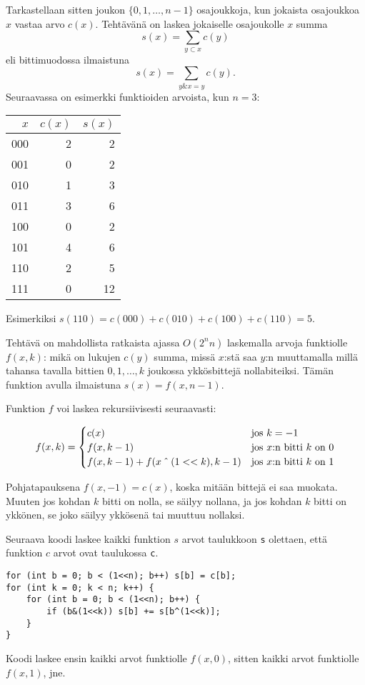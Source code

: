 Tarkastellaan sitten
joukon $\{0,1,\ldots,n-1\}$ osajoukkoja,
kun jokaista osajoukkoa $x$ vastaa arvo $c(x)$.
Tehtävänä on laskea jokaiselle osajoukolle $x$
summa
\[s(x)=\sum_{y \subset x} c(y) \]
eli bittimuodossa ilmaistuna
\[s(x)=\sum_{y \& x = y} c(y). \]
Seuraavassa on esimerkki funktioiden arvoista,
kun $n=3$:
\begin{center}
\begin{tabular}{rrr}
$x$ & $c(x)$ & $s(x)$ \\
\hline
000 & 2 & 2 \\
001 & 0 & 2 \\
010 & 1 & 3 \\
011 & 3 & 6 \\
100 & 0 & 2 \\
101 & 4 & 6 \\
110 & 2 & 5 \\
111 & 0 & 12 \\
\end{tabular}
\end{center}
Esimerkiksi $s(110)=c(000)+c(010)+c(100)+c(110)=5$. 

Tehtävä on mahdollista ratkaista ajassa $O(2^n n)$
laskemalla arvoja funktiolle $f(x,k)$:
mikä on lukujen $c(y)$ summa, missä $x$:stä saa $y$:n
muuttamalla millä tahansa tavalla bittien $0,1,\ldots,k$
joukossa ykkösbittejä nollabiteiksi.
Tämän funktion avulla ilmaistuna $s(x)=f(x,n-1)$.

Funktion $f$ voi laskea rekursiivisesti seuraavasti:

\begin{equation*}
    f(x,k) = \begin{cases}
               c(x)          & \textrm{jos $k=-1$}\\
               f(x,k-1)          & \textrm{jos $x$:n bitti $k$ on 0}\\
               f(x,k-1)+f(x \XOR (1 < < k),k-1)    & \textrm{jos $x$:n bitti $k$ on 1}\\
           \end{cases}
\end{equation*}

Pohjatapauksena $f(x,-1)=c(x)$,
koska mitään bittejä ei saa muokata.
Muuten jos kohdan $k$ bitti on nolla,
se säilyy nollana, ja jos kohdan $k$ bitti on ykkönen,
se joko säilyy ykkösenä tai muuttuu nollaksi.

Seuraava koodi laskee kaikki funktion $s$ arvot taulukkoon
\texttt{s} olettaen, että funktion $c$ arvot ovat
taulukossa \texttt{c}.
\begin{lstlisting}
for (int b = 0; b < (1<<n); b++) s[b] = c[b];
for (int k = 0; k < n; k++) {
    for (int b = 0; b < (1<<n); b++) {
        if (b&(1<<k)) s[b] += s[b^(1<<k)];
    }
}
\end{lstlisting}
Koodi laskee ensin kaikki arvot funktiolle $f(x,0)$,
sitten kaikki arvot funktiolle $f(x,1)$, jne.

